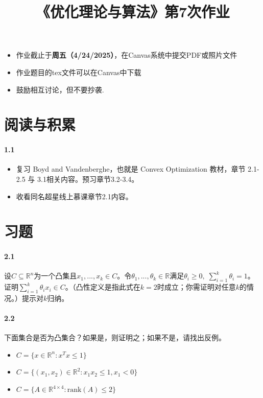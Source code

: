 \documentclass[12pt,a4paper]{article}
\begin{document}
\title{
{《优化理论与算法》第7次作业
}
}
\date{}


\maketitle
\begin{itemize}
	\item 作业截止于{\bf 周五（4/24/2025）}，在Canvas系统中提交PDF或照片文件
	\item 作业题目的tex文件可以在Canvas中下载
	\item 鼓励相互讨论，但不要抄袭.
\end{itemize}

\section{阅读与积累}
\paragraph{1.1}
\begin{itemize}
	\item 复习 Boyd and Vandenberghe，也就是 Convex Optimization 教材，章节 2.1-2.5 与 3.1相关内容。预习章节3.2-3.4。
\item 收看同名超星线上慕课章节2.1内容。
\end{itemize}

\section{习题}
\paragraph{2.1}
设$C\subseteq\mathbb{R}^n$为一个凸集且$x_1,...,x_k \in C$。令$\theta_1,...,\theta_k \in \mathbb{R}$满足$\theta_i \geq 0, \;\sum_{i=1}^k \theta_i=1$。证明$\sum_{i=1}^k\theta_i x_i\in C$。（凸性定义是指此式在$k=2$时成立；你需证明对任意$k$的情况。）提示对$k$归纳。


\paragraph{2.2}
下面集合是否为凸集合？如果是，则证明之；如果不是，请找出反例。
\begin{itemize}
\item[(a)] $C=\{x \in \mathbb{R}^n: x^Tx \leq 1\}$
    \item[(b)] $C =\{(x_1,x_2) \in \mathbb{R}^2 : x_1 x_2 \leq 1, x_1 < 0\}$ 
    \item[(c)] $C=\{A \in \mathbb{R}^{4 \times 4} : \text{rank}(A) \leq  2\}$
\end{itemize}
\end{document}
